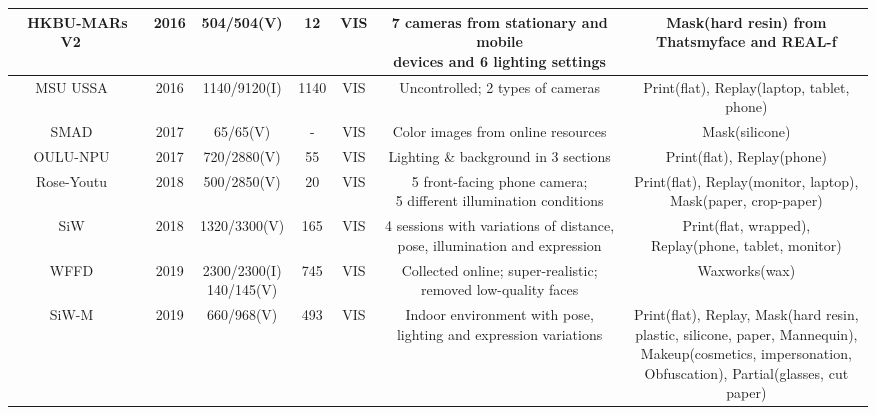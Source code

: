 \documentclass[10pt,journal,compsoc]{IEEEtran}
\begin{document}
\begin{table}
{\begin{tabular}{c c c c c c c}
 


 \midrule
HKBU-MARs V2
~\cite{liu20163d} & 2016 & 504/504(V) & 12 & VIS &  \tabincell{c}{ 7 cameras from stationary and mobile \\devices and 6 lighting settings} & \tabincell{c}{Mask(hard resin) from \\ Thatsmyface and REAL-f}\\



 \midrule
MSU USSA
~\cite{Patel2016Secure} & 2016 & 1140/9120(I) & 1140 & VIS &  Uncontrolled; 2 types of cameras & Print(flat), Replay(laptop, tablet, phone)\\

 \midrule
SMAD
~\cite{manjani2017detecting} & 2017 & 65/65(V) & - & VIS &  Color images from online resources & Mask(silicone)\\



 \midrule
OULU-NPU
~\cite{Boulkenafet2017OULU} & 2017 &  720/2880(V)  & 55 & VIS &  Lighting \& background in 3 sections  & Print(flat), Replay(phone)\\


 \midrule
Rose-Youtu
~\cite{li2018unsupervised} & 2018 &  500/2850(V) & 20 & VIS &  \tabincell{c}{5 front-facing phone camera; \\5 different illumination conditions}  & \tabincell{c}{Print(flat), Replay(monitor, laptop), \\Mask(paper, crop-paper)}\\



 \midrule
SiW
~\cite{Liu2018Learning} & 2018 &  1320/3300(V)  & 165 & VIS &  \tabincell{c}{4 sessions with variations of distance, \\pose, illumination and expression}  & \tabincell{c}{Print(flat, wrapped), \\Replay(phone, tablet, monitor)}\\



 \midrule
WFFD
~\cite{jia20203d} & 2019 & \tabincell{c}{2300/2300(I)\\140/145(V)} & 745 & VIS &  \tabincell{c}{Collected online; super-realistic; \\ removed low-quality faces}  & Waxworks(wax)\\

 \midrule
SiW-M
~\cite{liu2019deep} & 2019 & 660/968(V) & 493 &  VIS &  \tabincell{c}{Indoor environment with pose, \\lighting and expression variations}  & \tabincell{c}{Print(flat), Replay, Mask(hard resin, \\plastic, silicone, paper, Mannequin),\\ Makeup(cosmetics, impersonation, \\Obfuscation), Partial(glasses, cut paper)}\\



\end{tabular}}
\end{table}
\end{document}
